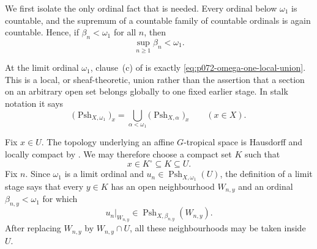 
We first isolate the only ordinal fact that is needed.  Every ordinal below
\(\omega _1\) is countable, and the supremum of a countable family of
countable ordinals is again countable.  Hence, if
\(\beta_n<\omega _1\) for all \(n\), then
\begin{equation}
 \label{eq:p072-countable-supremum}
                  \sup_{n\geq1}\beta_n<\omega _1.
\end{equation}

At the limit ordinal \(\omega _1\), clause~(c) of
\cite[Lemma~8.1.4]{CLD25} is exactly
\eqref{eq:p072-omega-one-local-union}.  This is a local, or
sheaf-theoretic, union rather than the assertion that a section on an
arbitrary open set belongs globally to one fixed earlier stage.  In stalk
notation it says
\begin{equation}
 \label{eq:p072-stalkwise-union}
  \bigl(\operatorname{Psh}_{X,\omega _1}\bigr)_x
  =
  \bigcup_{\alpha<\omega _1}
  \bigl(\operatorname{Psh}_{X,\alpha}\bigr)_x
  \qquad(x\in X).
\end{equation}

Fix \(x\in U\).  The topology underlying an affine \(G\)-tropical space is
Hausdorff and locally compact by \cite[\S3.1.1]{CLD25}.  We may therefore
choose a compact set \(K\) such that
\begin{equation}
 \label{eq:p072-compact-neighbourhood}
                    x\in K^\circ\subseteq K\subseteq U.
\end{equation}
Fix \(n\).  Since \(\omega _1\) is a limit ordinal and
\(u_n\in\operatorname{Psh}_{X,\omega _1}(U)\), the definition of a limit
stage says that every \(y\in K\) has an open neighbourhood \(W_{n,y}\)
and an ordinal \(\beta_{n,y}<\omega _1\) for which
\begin{equation}
 \label{eq:p072-local-rank}
     u_n|_{W_{n,y}}\in
     \operatorname{Psh}_{X,\beta_{n,y}}(W_{n,y}).
\end{equation}
After replacing \(W_{n,y}\) by \(W_{n,y}\cap U\), all these neighbourhoods
may be taken inside \(U\).

